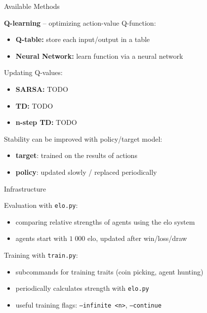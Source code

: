 \documentclass{beamer}
\begin{document}
\begin{frame}{Available Methods}
	\pause

	\textbf{Q-learning} -- optimizing action-value Q-function:
	\begin{itemize}
		\item \textbf{Q-table:} store each input/output in a table
		\item \textbf{Neural Network:} learn function via a neural network
	\end{itemize}

	\vspace{1.2em}
	\pause

	Updating Q-values:
	\begin{itemize}
		\item \textbf{SARSA:} TODO
		\item \textbf{TD:} TODO
		\item \textbf{n-step TD:} TODO
	\end{itemize}

	\vspace{1.2em}
	\pause

	Stability can be improved with policy/target model:
	\begin{itemize}
		\item \textbf{target}: trained on the results of actions
		\item \textbf{policy}: updated slowly / replaced periodically
	\end{itemize}
\end{frame}

\begin{frame}{Infrastructure}
	\pause

	Evaluation with \texttt{elo.py}:
	\begin{itemize}
		\item comparing relative strengths of agents using the elo system
		\item agents start with $1\;000$ elo, updated after win/loss/draw
	\end{itemize}

	\vspace{1.2em}
	\pause

	Training with \texttt{train.py}:
	\begin{itemize}
		\item subcommands for training traits (coin picking, agent hunting)
		\item periodically calculates strength with \texttt{elo.py}
		\item useful training flags: \texttt{--infinite <n>}, \texttt{--continue}
	\end{itemize}
\end{frame}
\end{document}
